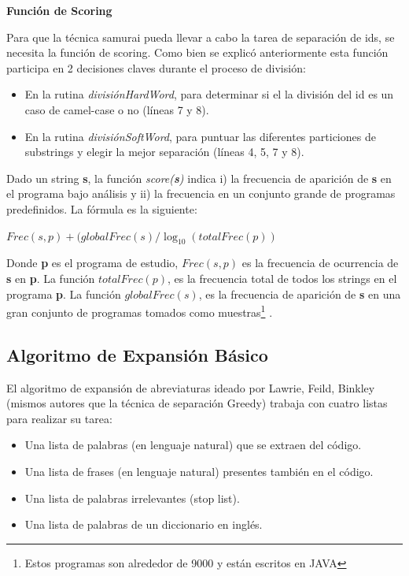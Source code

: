 \documentclass[a4paper,12pt]{report}
\begin{document}
\pagebreak
\noindent \textbf{Función de Scoring}

Para que la técnica samurai pueda llevar a cabo la tarea de separación de ids, se necesita la función de scoring. Como bien se explicó anteriormente esta función participa en 2 decisiones claves durante el proceso de división:

\begin{itemize}
\itemsep0em%
\item En la rutina \textit{divisiónHardWord}, para determinar si el la división del id es un caso de camel-case o no (líneas 7 y 8).

\item En la rutina \textit{divisiónSoftWord}, para puntuar las diferentes particiones de substrings y elegir la mejor separación (líneas 4, 5, 7 y 8).
\end{itemize}

Dado un string \textbf{s}, la función \textit{score(\textbf{s})} indica i) la frecuencia de aparición de \textbf{s} en el programa bajo análisis y ii) la frecuencia en un conjunto grande de programas predefinidos. La fórmula es la siguiente:

\begin{center}
$Frec(s,p) + ( globalFrec(s) / \log_{10}(totalFrec(p) )$
\end{center}

Donde \textbf{p} es el programa de estudio, $Frec(s,p)$ es la frecuencia de ocurrencia de \textbf{s} en \textbf{p}. La función $totalFrec(p)$, es la frecuencia total de todos los strings en el programa \textbf{p}. La función $globalFrec(s)$, es la frecuencia de aparición de \textbf{s} en una gran conjunto de programas tomados como muestras\footnote[1]{Estos programas son alrededor de 9000 y están escritos en JAVA} \cite{EHPV09}.

\pagebreak
\subsection{Algoritmo de Expansión Básico}

El algoritmo de expansión de abreviaturas ideado por Lawrie, Feild, Binkley (mismos autores que la técnica de separación Greedy) \cite{LFBEX07} trabaja con cuatro listas para realizar su tarea:

\begin{itemize}
\itemsep0em%
\item Una lista de palabras (en lenguaje natural) que se extraen del código.
\item Una lista de frases (en lenguaje natural) presentes también en el código.
\item Una lista de palabras irrelevantes (stop list).
\item Una lista de palabras de un diccionario en inglés.
\end{itemize}
\end{document}
